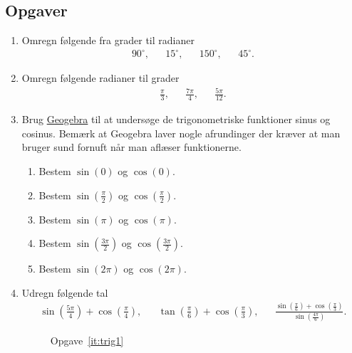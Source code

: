 \subsection{Opgaver}

\begin{enumerate}
	\item Omregn følgende fra grader til radianer
	\begin{align*}
	90^\circ,&& 15^\circ,&&150^\circ,&& 45^\circ.
	\end{align*}
	
	\item Omregn følgende radianer til grader
	\begin{align*}
	\frac{\pi}{3},&&\frac{7\pi}{4},&& \frac{5\pi}{12}.
	\end{align*}
	

	
		\item Brug \href{https://www.geogebra.org/m/e2vTM4Ut}{Geogebra} til at undersøge de trigonometriske funktioner sinus og cosinus. Bemærk at Geogebra laver nogle afrundinger der kræver at man bruger sund fornuft når man aflæser funktionerne.
	\begin{enumerate}
		\item Bestem $\sin(0)$ og $\cos(0)$.
		\item Bestem $\sin(\frac{\pi}{2})$ og $ \cos(\frac{\pi}{2}) $.
		\item Bestem $\sin(\pi)$ og $\cos(\pi)$.
		\item Bestem $\sin(\frac{3\pi}{2}) $ og $\cos(\frac{3\pi}{2})$.
		\item Bestem $\sin(2\pi)$ og $ \cos(2\pi) $.
	\end{enumerate}
	
	 \item Udregn følgende tal
	\begin{align*}
	\sin(\frac{5\pi}{4})+\cos(\frac{\pi}{4}),&& \tan(\frac{\pi}{6})+\cos(\frac{\pi}{3}),&& \frac{\sin(\frac{\pi}{6})+\cos(\frac{\pi}{3})}{\sin(\frac{4\pi}{6})}.
	\end{align*}
	
	\begin{figure}
		\centering
		\caption{Opgave~\ref{it:trig1}}
		\label{fig:trig1}
	\end{figure}
	


\end{enumerate}
